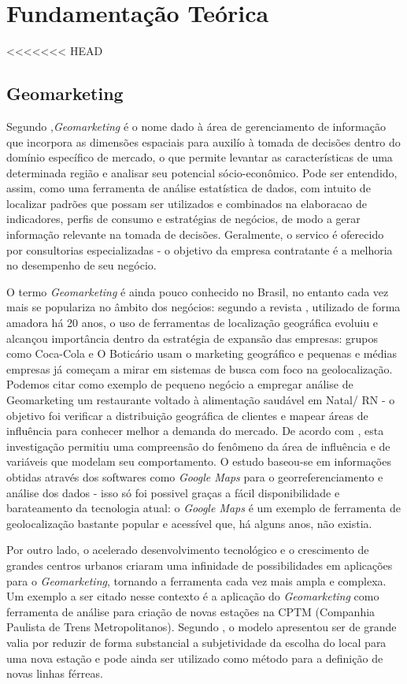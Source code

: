 
\chapter{Fundamentação Teórica}
\label{fundamentacao-teorica}

<<<<<<< HEAD
\section {Geomarketing}
\label{Geom}
Segundo ,\emph{Geomarketing} é o nome dado à área de gerenciamento de informação que incorpora as dimensões espaciais para auxilío à tomada de decisões dentro do domínio específico de mercado, o que permite levantar as características de uma determinada região e analisar seu potencial sócio-econômico. Pode ser entendido, assim, como uma ferramenta de análise estatística de dados, com intuito de localizar padrões que possam ser utilizados e combinados na elaboracao de indicadores, perfis de consumo e estratégias de negócios, de modo a gerar informação relevante na tomada de decisões. Geralmente, o servico é oferecido por consultorias especializadas - o  objetivo da empresa  contratante é a melhoria no desempenho de seu negócio.

O termo \emph{Geomarketing} é ainda pouco conhecido no Brasil, no entanto cada vez mais se populariza no âmbito dos negócios: segundo a revista , utilizado de forma amadora há 20 anos, o uso de ferramentas de localização geográfica evoluiu e alcançou importância dentro da estratégia de expansão das empresas: grupos como Coca-Cola e O Boticário usam o marketing geográfico e pequenas e médias empresas já começam a mirar em sistemas de busca com foco na geolocalização. Podemos citar como exemplo de pequeno negócio a empregar análise de Geomarketing um restaurante voltado à alimentação saudável em Natal/ RN - o objetivo foi verificar a distribuição geográfica de clientes e mapear áreas de influência para conhecer melhor a demanda do mercado. De acordo com , esta investigação permitiu uma compreensão do fenômeno da área de influência e de variáveis que modelam seu comportamento. O estudo baseou-se em informações obtidas através dos softwares como \emph{Google Maps} para o georreferenciamento e análise dos dados - isso só foi possivel graças a fácil disponibilidade e barateamento da tecnologia atual: o \emph{Google Maps} é um exemplo de ferramenta de geolocalização bastante popular e acessível que, há alguns anos, não existia. 

Por outro lado, o acelerado desenvolvimento tecnológico e o crescimento de grandes centros urbanos criaram uma infinidade de possibilidades em aplicações para o \emph{Geomarketing}, tornando a ferramenta cada vez mais ampla e complexa. Um exemplo a ser citado nesse contexto é a aplicação do \emph{Geomarketing} como ferramenta de análise para criação de novas estações na CPTM (Companhia Paulista de Trens Metropolitanos). Segundo , o modelo apresentou ser de grande valia por reduzir de forma substancial a subjetividade da escolha do local para uma nova estação e pode ainda ser utilizado como método para a definição de novas linhas férreas.

